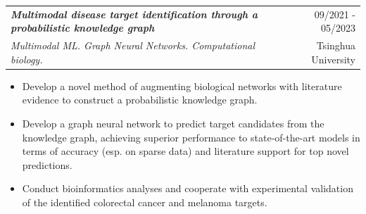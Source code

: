 \documentclass[letterpaper,11pt]{article}
\makeatletter
\newcommand{\resumeItem}[1]{
  \item\small{
    {#1 \vspace{-1pt}}
  }
}
\newcommand{\resumeSubheading}[4]{
  \vspace{-1pt}\item
    \begin{tabular*}{\textwidth}[t]{l@{\extracolsep{\fill}}r}
      \textbf{\textit{#1}} & {\color{dark-grey}\small #2}\vspace{1pt}\\ %
      \textit{#3} & {\color{dark-grey} \small #4}\\ %
    \end{tabular*}\vspace{-4pt}
}
\newcommand{\resumeItemListStart}{\begin{itemize}}
\newcommand{\resumeItemListEnd}{\end{itemize}\vspace{0pt}}
\makeatother
\begin{document}
    \resumeSubheading
      {Multimodal disease target identification through a probabilistic knowledge graph}{09/2021 - 05/2023}
      {Multimodal ML. Graph Neural Networks. Computational biology.}{Tsinghua University}%
      \resumeItemListStart
        \resumeItem {Develop a novel method of augmenting biological networks with literature evidence to construct a probabilistic knowledge graph.} 
        \resumeItem {Develop a graph neural network to predict target candidates from the knowledge graph, achieving superior performance to state-of-the-art 
        models in terms of accuracy (esp. on sparse data) and literature support for top novel predictions.}
        \resumeItem {Conduct bioinformatics analyses and cooperate with experimental validation of the identified colorectal cancer and melanoma targets.}
      \resumeItemListEnd


    
\end{document}
